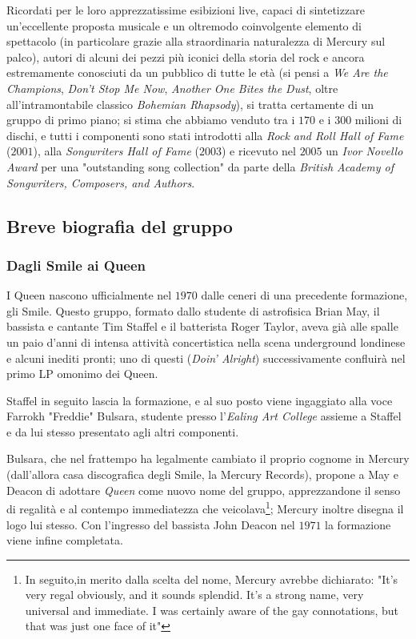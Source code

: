 \documentclass[12pt]{article}
\begin{document}
Ricordati per le loro apprezzatissime esibizioni live, capaci di sintetizzare un'eccellente proposta musicale e un oltremodo coinvolgente elemento di spettacolo (in particolare grazie alla straordinaria naturalezza di Mercury sul palco), autori di alcuni dei pezzi più iconici della storia del rock e ancora estremamente conosciuti da un pubblico di tutte le età (si pensi a \emph{We Are the Champions}, \emph{Don't Stop Me Now}, \emph{Another One Bites the Dust}, oltre all'intramontabile classico \emph{Bohemian Rhapsody}), si tratta certamente di un gruppo di primo piano; si stima che abbiamo venduto tra i \(170\) e i \(300\) milioni di dischi, e tutti i componenti sono stati introdotti alla \emph{Rock and Roll Hall of Fame} (\(2001\)), alla \emph{Songwriters Hall of Fame} (\(2003\)) e ricevuto nel \(2005\) un \emph{Ivor Novello Award} per una "outstanding song collection" da parte della \emph{British Academy of Songwriters, Composers, and Authors}.

\subsection{Breve biografia del gruppo}
\subsubsection{Dagli Smile ai Queen}
I Queen nascono ufficialmente nel \(1970\) dalle ceneri di una precedente formazione, gli Smile. Questo gruppo, formato dallo studente di astrofisica Brian May, il bassista e cantante Tim Staffel e il batterista Roger Taylor, aveva già alle spalle un paio d'anni di intensa attività concertistica nella scena underground londinese e alcuni inediti pronti; uno di questi (\emph{Doin' Alright}) successivamente confluirà nel primo LP omonimo dei Queen.

Staffel in seguito lascia la formazione, e al suo posto viene ingaggiato alla voce Farrokh "Freddie" Bulsara, studente presso l'\emph{Ealing Art College} assieme a Staffel e da lui stesso presentato agli altri componenti.

Bulsara, che nel frattempo ha legalmente cambiato il proprio cognome in Mercury (dall'allora casa discografica degli Smile, la Mercury Records), propone a May e Deacon di adottare \emph{Queen} come nuovo nome del gruppo, apprezzandone il senso di regalità e al contempo immediatezza che veicolava\footnote{In seguito,in merito dalla scelta del nome, Mercury avrebbe dichiarato: "It's very regal obviously, and it sounds splendid. It's a strong name, very universal and immediate. I was certainly aware of the gay connotations, but that was just one face of it"}; Mercury inoltre disegna il logo lui stesso. Con l'ingresso del bassista John Deacon nel \(1971\) la formazione viene infine completata.
\end{document}
